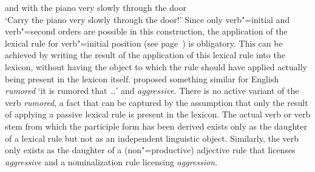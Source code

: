 \begin{exe}
\begin{xlist}[iv.]
\begin{exe}
\begin{xlist}[iv.]
	 and with the piano very slowly through the door\\
\glt `Carry the piano very slowly through the door!'
\z
\addlines
Since only verb"=initial and verb"=second orders are possible in this construction, the application of the lexical rule for verb"=initial position
(see page~\pageref{lr-verb-movement}) is obligatory. This can be achieved by writing the result of the application of this lexical rule into the lexicon, without
having the object to which the rule should have applied actually being present in the lexicon itself. 
\citet[Section~3.4.2, 5.3]{Koenig99a} proposed something similar for English \emph{rumored} `it is rumored that \ldots' and \emph{aggressive}. 
There is no active variant of the verb \emph{rumored}, a fact that can be captured by the assumption that only the result of applying a passive lexical rule
is present in the lexicon. The actual verb or verb stem from which the participle form has been
derived exists only as the daughter of a lexical rule but not as an independent linguistic
object. Similarly, the verb  only exists as the daughter of a (non"=productive)
adjective rule that licenses \emph{aggressive} and a nominalization rule licensing \emph{aggression}.


\end{xlist}
\end{exe}
\end{xlist}
\end{exe}
